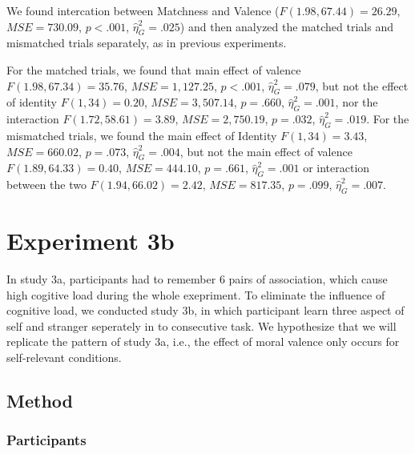 \documentclass[man]{apa6}
\begin{document}
We found intercation between Matchness and Valence (\(F(1.98, 67.44) = 26.29\), \(\mathit{MSE} = 730.09\), \(p < .001\), \(\hat{\eta}^2_G = .025\)) and then analyzed the matched trials and mismatched trials separately, as in previous experiments.

For the matched trials, we found that main effect of valence \(F(1.98, 67.34) = 35.76\), \(\mathit{MSE} = 1,127.25\), \(p < .001\), \(\hat{\eta}^2_G = .079\), but not the effect of identity \(F(1, 34) = 0.20\), \(\mathit{MSE} = 3,507.14\), \(p = .660\), \(\hat{\eta}^2_G = .001\), nor the interaction \(F(1.72, 58.61) = 3.89\), \(\mathit{MSE} = 2,750.19\), \(p = .032\), \(\hat{\eta}^2_G = .019\).
For the mismatched trials, we found the main effect of Identity \(F(1, 34) = 3.43\), \(\mathit{MSE} = 660.02\), \(p = .073\), \(\hat{\eta}^2_G = .004\), but not the main effect of valence \(F(1.89, 64.33) = 0.40\), \(\mathit{MSE} = 444.10\), \(p = .661\), \(\hat{\eta}^2_G = .001\) or interaction between the two \(F(1.94, 66.02) = 2.42\), \(\mathit{MSE} = 817.35\), \(p = .099\), \(\hat{\eta}^2_G = .007\).

\hypertarget{experiment-3b}{%
\section{Experiment 3b}\label{experiment-3b}}

In study 3a, participants had to remember 6 pairs of association, which cause high cogitive load during the whole exepriment. To eliminate the influence of cognitive load, we conducted study 3b, in which participant learn three aspect of self and stranger seperately in to consecutive task. We hypothesize that we will replicate the pattern of study 3a, i.e., the effect of moral valence only occurs for self-relevant conditions.

\hypertarget{method-4}{%
\subsection{Method}\label{method-4}}

\hypertarget{participants-5}{%
\subsubsection{Participants}\label{participants-5}}
\end{document}
